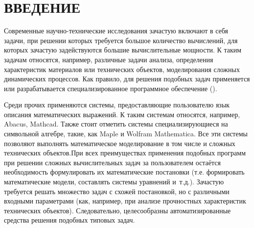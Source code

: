 \chapter*{ВВЕДЕНИЕ}\label{chap.introduction}
Современные научно-технические исследования зачастую включают в себя задачи, при решении которых требуется большое количество вычислений, для которых зачастую задействуются большие вычислительные мощности. К таким задачам относятся, например, различные задачи анализа, определения характеристик материалов или технических объектов, моделирования сложных динамических процессов. Как правило, для решения подобных задач применяется или разрабатывается специализированное программное обеспечение ().

Среди прочих применяются системы, предоставляющие пользователю язык описания математических выражений. К таким системам относятся, например, Abacus\cite{PiessensAbacus1989}, Mathcad. Также стоит отметить системы специализирующиеся на символьной алгебре, такие, как Maple\cite{CharMaple1983} и Wolfram Mathematica. Все эти системы позволяют выполнять математическое моделирование в том числе и сложных технических объектов.При всех преимуществах применения подобных программ при решении сложных вычислительных задач за пользователем остаётся необходимость формулировать их математические постановки (т.е. формировать математические модели, составлять системы уравнений и~т.д.). Зачастую требуется решать множество задач с схожей постановкой, но с различными входными параметрами (как, например, при анализе прочностных характеристик технических объектов). Следовательно, целесообразны автоматизированные средства решения подобных типовых задач.

